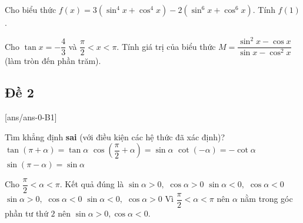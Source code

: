 \begin{ex}%
Cho biểu thức $f(x)=3\left(\sin ^4 x+\cos ^4 x\right)-2\left(\sin ^6 x+\cos ^6 x\right)$. Tính $ f(1)$.
\end{ex}






\begin{ex}%
Cho $\tan x=-\dfrac{4}{3}$ và $\dfrac{\pi}{2}<x<\pi$. Tính giá trị của biểu thức $M=\dfrac{\sin ^2 x-\cos x}{\sin x-\cos ^2 x}$ (làm tròn đến phần trăm).\\
\end{ex}




\subsection{Đề 2}

[ans/ans-0-B1]
\caulc



\begin{ex}%
	Tìm khẳng định {\bf sai} (với điều kiện các hệ thức đã xác định)?
	\choice
	{$\tan\left(\pi+\alpha\right)=\tan\alpha $}
	{\True $\cos\left(\dfrac{\pi}{2}+\alpha\right)=\sin\alpha $}
	{$\cot\left(-\alpha\right)=-\cot\alpha $}
	{$\sin\left(\pi-\alpha\right)=\sin\alpha $}
\end{ex}



\begin{ex}%
	Cho $\dfrac{\pi}{2}<\alpha <\pi $. Kết quả đúng là
	\choice
	{$\sin\alpha >0,$ $\cos\alpha >0$}
	{$\sin\alpha <0,$ $\cos\alpha <0$}
	{\True $\sin\alpha >0,$ $\cos\alpha <0$}
	{$\sin\alpha <0,$ $\cos\alpha >0$}
	\loigiai
	{	Vì $\dfrac{\pi}{2}<\alpha <\pi $ nên $\alpha $ nằm trong góc phần tư thứ $ 2$ nên $\sin\alpha >0,\cos\alpha <0$.}
\end{ex}



